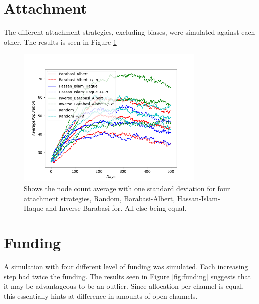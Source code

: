 \section{Attachment}

The different attachment strategies, excluding biases, were simulated against each other. The results is seen in Figure \ref{fig:history_attachment} 

\begin{figure}[!htb]
	
	\hspace*{-0.5cm}
	\centering
	\includegraphics[width=9cm]{images/histories_deviation_attachment.png}
	\caption{ Shows the node count average with one standard deviation for four attachment strategies, Random, Barabasi-Albert, Hassan-Islam-Haque and Inverse-Barabasi for. All else being equal. }
	\label{fig:history_attachment}
	\hspace*{2mm} 
\end{figure}

\section{Funding}

A simulation with four different level of funding was simulated. Each increasing step had twice the funding. The results seen in Figure \ref{fig:funding} suggests that it may be advantageous to be an outlier. Since allocation per channel is equal, this essentially hints at difference in amounts of open channels.


